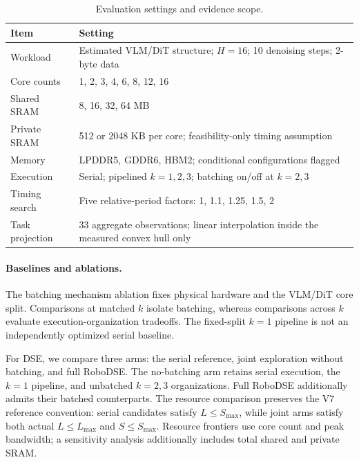 \begin{table}[t]
\centering
\caption{Evaluation settings and evidence scope.}
\label{tab:eval-setup}
\small
\begin{tabular}{@{}p{}p{}@{}}
\toprule
Item & Setting \\
\midrule
Workload & Estimated VLM/DiT structure; $H=16$; 10 denoising steps; 2-byte data \\
Core counts & 1, 2, 3, 4, 6, 8, 12, 16 \\
Shared SRAM & 8, 16, 32, 64 MB \\
Private SRAM & 512 or 2048 KB per core; feasibility-only timing assumption \\
Memory & LPDDR5, GDDR6, HBM2; conditional configurations flagged \\
Execution & Serial; pipelined $k=1,2,3$; batching on/off at $k=2,3$ \\
Timing search & Five relative-period factors: 1, 1.1, 1.25, 1.5, 2 \\
Task projection & 33 aggregate observations; linear interpolation inside the measured convex hull only \\
\bottomrule
\end{tabular}
\end{table}

\paragraph{Baselines and ablations.}
The batching mechanism ablation fixes physical hardware and the VLM/DiT
core split. Comparisons at matched $k$ isolate batching, whereas comparisons
across $k$ evaluate execution-organization tradeoffs. The fixed-split $k=1$
pipeline is not an independently optimized serial baseline.

For DSE, we compare three arms: the serial reference, joint exploration without
batching, and full RoboDSE. The no-batching arm retains serial execution,
the $k=1$ pipeline, and unbatched $k=2,3$ organizations. Full RoboDSE additionally
admits their batched counterparts. The resource comparison preserves the V7
reference convention: serial candidates satisfy $L\leq S_{\max}$, while joint
arms satisfy both actual $L\leq L_{\max}$ and $S\leq S_{\max}$. Resource
frontiers use core count and peak bandwidth; a sensitivity analysis additionally
includes total shared and private SRAM.

